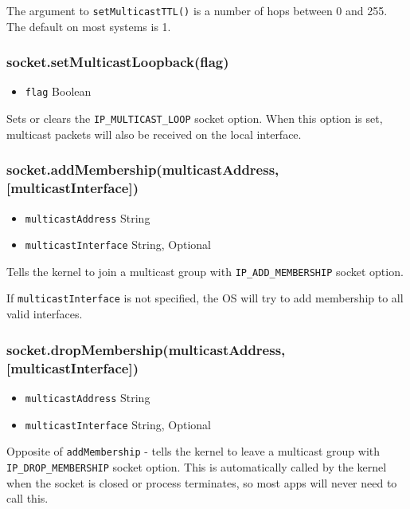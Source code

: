 The argument to \texttt{setMulticastTTL()} is a number of hops between 0
and 255. The default on most systems is 1.

\subsubsection{socket.setMulticastLoopback(flag)}\label{socket.setmulticastloopbackflag}

\begin{itemize}
\itemsep1pt\parskip0pt
\item
  \texttt{flag} Boolean
\end{itemize}

Sets or clears the \texttt{IP\_MULTICAST\_LOOP} socket option. When this
option is set, multicast packets will also be received on the local
interface.

\subsubsection{socket.addMembership(multicastAddress,
{[}multicastInterface{]})}\label{socket.addmembershipmulticastaddress-multicastinterface}

\begin{itemize}
\itemsep1pt\parskip0pt
\item
  \texttt{multicastAddress} String
\item
  \texttt{multicastInterface} String, Optional
\end{itemize}

Tells the kernel to join a multicast group with
\texttt{IP\_ADD\_MEMBERSHIP} socket option.

If \texttt{multicastInterface} is not specified, the OS will try to add
membership to all valid interfaces.

\subsubsection{socket.dropMembership(multicastAddress,
{[}multicastInterface{]})}\label{socket.dropmembershipmulticastaddress-multicastinterface}

\begin{itemize}
\itemsep1pt\parskip0pt
\item
  \texttt{multicastAddress} String
\item
  \texttt{multicastInterface} String, Optional
\end{itemize}

Opposite of \texttt{addMembership} - tells the kernel to leave a
multicast group with \texttt{IP\_DROP\_MEMBERSHIP} socket option. This
is automatically called by the kernel when the socket is closed or
process terminates, so most apps will never need to call this.

